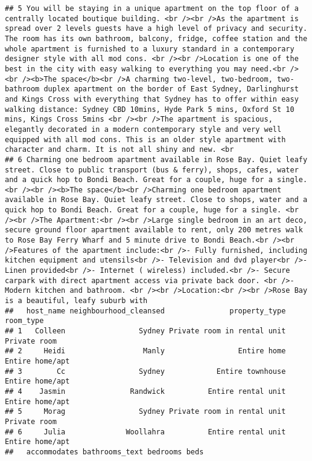 \documentclass[
]{article}
\begin{document}
\begin{verbatim}
## 5 You will be staying in a unique apartment on the top floor of a centrally located boutique building. <br /><br />As the apartment is spread over 2 levels guests have a high level of privacy and security. The room has its own bathroom, balcony, fridge, coffee station and the whole apartment is furnished to a luxury standard in a contemporary designer style with all mod cons. <br /><br />Location is one of the best in the city with easy walking to everything you may need.<br /><br /><b>The space</b><br />A charming two-level, two-bedroom, two-bathroom duplex apartment on the border of East Sydney, Darlinghurst and Kings Cross with everything that Sydney has to offer within easy walking distance: Sydney CBD 10mins, Hyde Park 5 mins, Oxford St 10 mins, Kings Cross 5mins <br /><br />The apartment is spacious, elegantly decorated in a modern contemporary style and very well equipped with all mod cons. This is an older style apartment with character and charm. It is not all shiny and new. <br
## 6 Charming one bedroom apartment available in Rose Bay. Quiet leafy street. Close to public transport (bus & ferry), shops, cafes, water and a quick hop to Bondi Beach. Great for a couple, huge for a single.<br /><br /><b>The space</b><br />Charming one bedroom apartment available in Rose Bay. Quiet leafy street. Close to shops, water and a quick hop to Bondi Beach. Great for a couple, huge for a single. <br /><br />The Apartment:<br /><br />Large single bedroom in an art deco, secure ground floor apartment available to rent, only 200 metres walk to Rose Bay Ferry Wharf and 5 minute drive to Bondi Beach.<br /><br />Features of the apartment include:<br />- Fully furnished, including kitchen equipment and utensils<br />- Television and dvd player<br />- Linen provided<br />- Internet ( wireless) included.<br />- Secure carpark with direct apartment access via private back door. <br />- Modern kitchen and bathroom. <br /><br />Location:<br /><br />Rose Bay is a beautiful, leafy suburb with
##   host_name neighbourhood_cleansed               property_type       room_type
## 1   Colleen                 Sydney Private room in rental unit    Private room
## 2     Heidi                  Manly                 Entire home Entire home/apt
## 3        Cc                 Sydney            Entire townhouse Entire home/apt
## 4    Jasmin               Randwick          Entire rental unit Entire home/apt
## 5     Morag                 Sydney Private room in rental unit    Private room
## 6     Julia              Woollahra          Entire rental unit Entire home/apt
##   accommodates bathrooms_text bedrooms beds

\end{verbatim}
\end{document}
